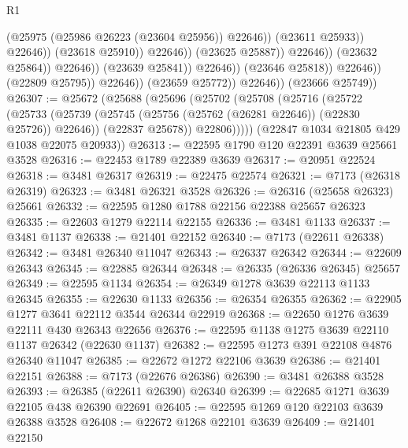 \begin{lexlean}{R1}
\begin{coremodule}
                                                        (@25975
                                                          (@25986 @26223 (@23604 @25956))
                                                          @22646))
                                                      (@23611 @25933))
                                                    @22646))
                                                (@23618 @25910))
                                              @22646))
                                          (@23625 @25887))
                                        @22646))
                                    (@23632 @25864))
                                  @22646))
                              (@23639 @25841))
                            @22646))
                        (@23646 @25818))
                      @22646))
                  (@22809 @25795))
                @22646))
            (@23659 @25772))
          @22646))
      (@23666 @25749))
@26307 := @25672
    (@25688
      (@25696
        (@25702
          (@25708
            (@25716
              (@25722
                (@25733
                  (@25739 (@25745 (@25756 (@25762 (@26281 @22646)) (@22830 @25726)) @22646))
                  (@22837 @25678))
                @22806)))))
      (@22847 @1034 @21805 @429 @1038 @22075 @20933))
@26313 := @22595 @1790 @120 @22391 @3639 @25661 @3528
@26316 := @22453 @1789 @22389 @3639
@26317 := @20951 @22524
@26318 := @3481 @26317
@26319 := @22475 @22574
@26321 := @7173 (@26318 @26319)
@26323 := @3481 @26321 @3528
@26326 := @26316 (@25658 @26323) @25661
@26332 := @22595 @1280 @1788 @22156 @22388 @25657 @26323
@26335 := @22603 @1279 @22114 @22155
@26336 := @3481 @1133
@26337 := @3481 @1137
@26338 := @21401 @22152
@26340 := @7173 (@22611 @26338)
@26342 := @3481 @26340 @11047
@26343 := @26337 @26342
@26344 := @22609 @26343
@26345 := @22885 @26344
@26348 := @26335 (@26336 @26345) @25657
@26349 := @22595 @1134
@26354 := @26349 @1278 @3639 @22113 @1133 @26345
@26355 := @22630 @1133
@26356 := @26354 @26355
@26362 := @22905 @1277 @3641 @22112 @3544 @26344 @22919
@26368 := @22650 @1276 @3639 @22111 @430 @26343 @22656
@26376 := @22595 @1138 @1275 @3639 @22110 @1137 @26342 (@22630 @1137)
@26382 := @22595 @1273 @391 @22108 @4876 @26340 @11047
@26385 := @22672 @1272 @22106 @3639
@26386 := @21401 @22151
@26388 := @7173 (@22676 @26386)
@26390 := @3481 @26388 @3528
@26393 := @26385 (@22611 @26390) @26340
@26399 := @22685 @1271 @3639 @22105 @438 @26390 @22691
@26405 := @22595 @1269 @120 @22103 @3639 @26388 @3528
@26408 := @22672 @1268 @22101 @3639
@26409 := @21401 @22150

\end{coremodule}
\end{lexlean}
